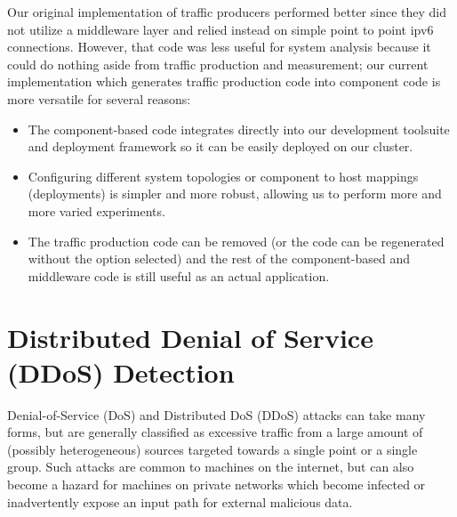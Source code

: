 \begin{definition}[Note:]
Our original implementation of traffic producers performed
	  better since they did not utilize a middleware layer and
	  relied instead on simple point to point ipv6 connections.
	  However, that code was less useful for system analysis
	  because it could do nothing aside from traffic production
	  and measurement; our current implementation which generates
	  traffic production code into component code is more
	  versatile for several reasons:

          \begin{itemize}
	  \item The component-based code integrates directly into our development
	    toolsuite and deployment framework so it can be easily deployed on
	    our cluster.
	  \item Configuring different system topologies or component to host
	    mappings (deployments) is simpler and more robust, allowing us to
	    perform more and more varied experiments.
	  \item The traffic production code can be removed (or the code can be
	    regenerated without the option selected) and the rest of the
	    component-based and middleware code is still useful as an actual
	    application.
          \end{itemize}
\end{definition}

\newpage
\section{Distributed Denial of Service (DDoS) Detection}
\label{sec:ddos}

Denial-of-Service (DoS)\cite{rfc4732} and Distributed DoS (DDoS) attacks
can take many forms, but are generally classified as excessive traffic
from a large amount of (possibly heterogeneous) sources targeted
towards a single point or a single group.  Such attacks are common to
machines on the internet, but can also become a hazard for machines on
private networks which become infected or inadvertently expose an
input path for external malicious data.

